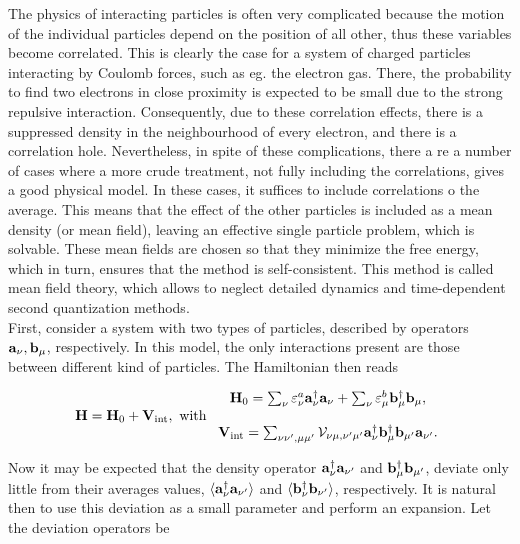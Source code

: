 \documentclass{homework}
\begin{document}
The physics of interacting particles is often very complicated because the motion of the individual particles depend on the position of all other, thus these variables become correlated. This is clearly the case for a system of charged particles interacting by Coulomb forces, such as eg. the electron gas. There, the probability to find two electrons in close proximity is expected to be small due to the strong repulsive interaction. Consequently, due to these correlation effects, there is a suppressed density in the neighbourhood of every electron, and there is a correlation hole. 
Nevertheless, in spite of these complications, there a re a number of cases where a more crude treatment, not fully including the correlations, gives a good physical model. In these cases, it suffices to include correlations o the average. This means that the effect of the other particles is included as a mean density (or mean field), leaving an effective single particle problem, which is solvable. These mean fields are chosen so that they minimize the free energy, which in turn, ensures that the method is self-consistent. This method is called mean field theory, which allows to neglect detailed dynamics and time-dependent second quantization methods. \\

First, consider a system with two types of particles, described by operators ${\bf a}_\nu, {\bf b}_{\mu}$, respectively. In this model, the only interactions present are those between different kind of particles. The Hamiltonian then reads

\begin{equation}
    {\bf H} = {\bf H}_0 + {\bf V}_{\textnormal{int}}, \textnormal{ with } \begin{array}{c}
         {\bf H}_0 = \sum_{\nu} \varepsilon_{\nu}^a {\bf a}_\nu^\dagger {\bf a}_\nu + \sum_{\nu} \varepsilon_{\mu}^b{\bf b}_\mu^\dagger {\bf b}_\mu,  \\
         \\
         {\bf V}_{\textnormal{int}}  = \sum_{\nu\nu', \mu\mu'} {\mathcal V}_{\nu\mu, \nu'\mu'} {\bf a}^\dagger_{\nu} {\bf b}_{\mu}^\dagger {\bf b}_{\mu'} {\bf a}_{\nu'}.
    \end{array}
\end{equation}

Now it may be expected that the density operator ${\bf a}_{\nu}^\dagger {\bf a}_{\nu'}$ and ${\bf b}_{\mu}^\dagger {\bf b}_{\mu'}$, deviate only little from their averages values, $ \langle {\bf a}_{\nu}^\dagger {\bf a}_{\nu'} \rangle$ and  $ \langle {\bf b}_{\nu}^\dagger {\bf b}_{\nu'} \rangle$, respectively. It is natural then to use this deviation as a small parameter and perform an expansion. Let the deviation operators be 
\end{document}
